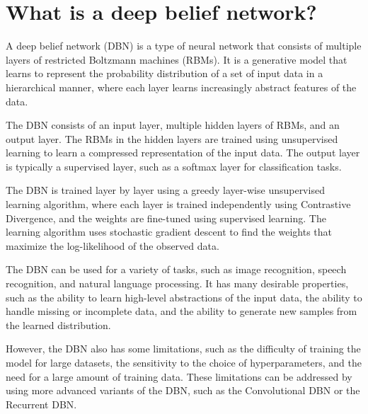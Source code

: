 \section{What is a deep belief network?}
A deep belief network (DBN) is a type of neural network that consists of multiple layers of restricted Boltzmann machines (RBMs). It is a generative model that learns to represent the probability distribution of a set of input data in a hierarchical manner, where each layer learns increasingly abstract features of the data.

The DBN consists of an input layer, multiple hidden layers of RBMs, and an output layer. The RBMs in the hidden layers are trained using unsupervised learning to learn a compressed representation of the input data. The output layer is typically a supervised layer, such as a softmax layer for classification tasks.

The DBN is trained layer by layer using a greedy layer-wise unsupervised learning algorithm, where each layer is trained independently using Contrastive Divergence, and the weights are fine-tuned using supervised learning. The learning algorithm uses stochastic gradient descent to find the weights that maximize the log-likelihood of the observed data.

The DBN can be used for a variety of tasks, such as image recognition, speech recognition, and natural language processing. It has many desirable properties, such as the ability to learn high-level abstractions of the input data, the ability to handle missing or incomplete data, and the ability to generate new samples from the learned distribution.

However, the DBN also has some limitations, such as the difficulty of training the model for large datasets, the sensitivity to the choice of hyperparameters, and the need for a large amount of training data. These limitations can be addressed by using more advanced variants of the DBN, such as the Convolutional DBN or the Recurrent DBN.

